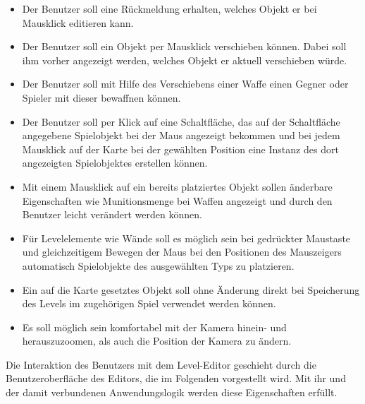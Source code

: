 \begin{itemize}
	\item Der Benutzer soll eine Rückmeldung erhalten, welches Objekt er bei Mausklick editieren kann.
	\item Der Benutzer soll ein Objekt per Mausklick verschieben können. Dabei soll ihm vorher angezeigt werden, welches Objekt er aktuell verschieben würde.
	\item Der Benutzer soll mit Hilfe des Verschiebens einer Waffe einen Gegner oder Spieler mit dieser bewaffnen können.
	\item Der Benutzer soll per Klick auf eine Schaltfläche, das auf der Schaltfläche angegebene Spielobjekt bei der Maus angezeigt bekommen und bei jedem Mausklick auf der Karte bei der gewählten Position eine Instanz des dort angezeigten Spielobjektes erstellen können.
	\item Mit einem Mausklick auf ein bereits platziertes Objekt sollen änderbare Eigenschaften wie Munitionsmenge bei Waffen angezeigt und durch den Benutzer leicht verändert werden können.
	\item Für Levelelemente wie Wände soll es möglich sein bei gedrückter Maustaste und gleichzeitigem Bewegen der Maus bei den Positionen des Mauszeigers automatisch Spielobjekte des ausgewählten Typs zu platzieren.
	\item Ein auf die Karte gesetztes Objekt soll ohne Änderung direkt bei Speicherung des Levels im zugehörigen Spiel verwendet werden können.
	\item Es soll möglich sein komfortabel mit der Kamera hinein- und herauszuzoomen, als auch die Position der Kamera zu ändern.
\end{itemize}

Die Interaktion des Benutzers mit dem Level-Editor geschieht durch die Benutzeroberfläche des Editors, die im Folgenden vorgestellt wird. Mit ihr und der damit verbundenen Anwendungslogik werden diese Eigenschaften erfüllt. 

